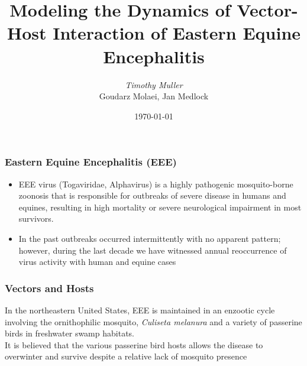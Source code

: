 \documentclass{beamer}
\title[]{Modeling the Dynamics of Vector-Host Interaction of Eastern Equine Encephalitis} %
\author[Tim Muller]{\emph{Timothy Muller} \\ Goudarz Molaei, Jan Medlock}
\institute[ORST] %
{
Oregon State University \\ %
\medskip
\textit{mullert@onid.orst.edu} %
}
\date{\today} %
\begin{document}
\begin{frame}
\titlepage %
\end{frame}




\begin{frame}
\frametitle{Eastern Equine Encephalitis (EEE)}
\begin{itemize}
\item EEE virus (Togaviridae, Alphavirus) is a highly pathogenic mosquito-borne zoonosis that is responsible for outbreaks of severe disease in humans and equines, resulting in high mortality or severe neurological impairment in most survivors.
\item In the past outbreaks occurred intermittently with no apparent pattern; however, during the last decade we have witnessed annual reoccurrence of virus activity with human and equine cases
\end{itemize}
\end{frame}

\begin{frame}
\frametitle{Vectors and Hosts}
\begin{block}{}
In the northeastern United States, EEE is maintained in an enzootic cycle involving the ornithophilic mosquito, \textit{Culiseta melanura} and a variety of passerine birds in freshwater swamp habitats. \\
It is believed that the various passerine bird hosts allows the disease to overwinter and survive despite a relative lack of mosquito presence
\end{block}
\end{frame}
\end{document}
